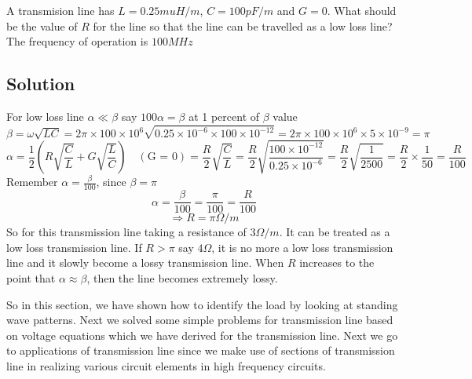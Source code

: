 \begin{exmp}
A transmision line has $L = 0.25muH/m$, $C=100pF/m$ and ${G=0}$. What should be the value of ${R}$ for the line so that the line can be travelled as a low loss line? The frequency of operation is ${100MHz}$

\subsection*{Solution}
For low loss line ${\alpha\ll\beta}$ say ${100\alpha=\beta}$ at 1 percent of ${\beta}$ value
\begin{dmath*}
\beta=\omega\sqrt{LC}
= {2\pi\times100\times10^6\sqrt{0.25\times10^{-6}\times100\times10^{-12}}}
=2\pi\times100\times10^6\times5\times10^{-9}
=\pi
\end{dmath*}
\begin{dmath*}
\alpha={\frac{1}{2}}\left(R\sqrt{\frac{C}{L}}+G\sqrt{\frac{L}{C}}\right)\quad (\text{G = 0})
={\frac{R}{2}}\sqrt{\frac{C}{L}}
=\frac{R}{2}\sqrt{\frac{100\times10^{-12}}{0.25\times10^{-6}}}
=\frac{R}{2}\sqrt{\frac{1}{2500}}
=\frac{R}{2}\times\frac{1}{50}
=\frac{R}{100}
\end{dmath*}
Remember ${\alpha = \frac{\beta}{100}}$, since ${\beta = \pi}$
\begin{dmath*}
\alpha = \frac{\beta}{100} 
= \frac{\pi}{100} 
= \frac{R}{100}
\end{dmath*}
\[\Longrightarrow R = \pi\Omega/m \]
So for this transmission line taking a resistance of ${3\Omega /m}$. It can be treated as a low loss transmission line. If ${R>\pi}$ say ${4\Omega}$, it is no more a low loss transmission line and it slowly become a lossy transmission line. When ${R}$ increases to the point that ${\alpha\approx\beta}$, then the line becomes extremely lossy.
\end{exmp}

So in this section, we have shown how to identify the load by looking at standing wave patterns. Next we solved some simple problems for transmission line based on voltage equations which we have derived for the transmission line. Next we go to applications of transmission line since we make use of sections of transmission line in realizing various circuit elements in high frequency circuits.

